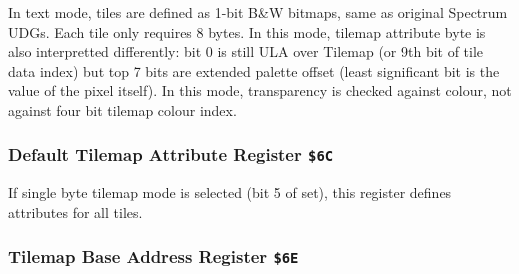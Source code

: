 \documentclass[12pt,twoside,openright,a4paper]{book}
\begin{document}
\begin{NextPort}
\end{NextPort}

In text mode, tiles are defined as 1-bit B\&W bitmaps, same as original Spectrum UDGs. Each tile only requires 8 bytes. In this mode, tilemap attribute byte is also interpretted differently: bit 0 is still ULA over Tilemap (or 9th bit of tile data index) but top 7 bits are extended palette offset (least significant bit is the value of the pixel itself). In this mode, transparency is checked against  colour, not against four bit tilemap colour index.


\subsubsection{Default Tilemap Attribute Register {\tt \$6C}}

If single byte tilemap mode is selected (bit 5 of  set), this register defines attributes for all tiles.

\begin{NextPort}
\end{NextPort}


\subsubsection{Tilemap Base Address Register {\tt \$6E}}

\begin{NextPort}
\end{NextPort}
\end{document}
